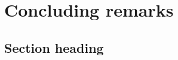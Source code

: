 \graphicspath{{Chapters/ConcludingRemarks/}}

\chapter{Concluding remarks}

\section{Section heading}
